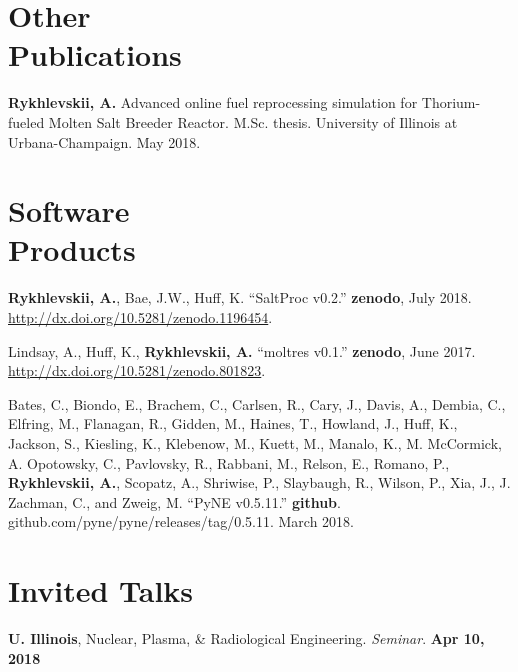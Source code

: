 \documentclass[margin,line]{resume}
\begin{document}
\begin{resume}
\section{\mysidestyle Other\\Publications}
\begin{bibenum}
	\item \textbf{Rykhlevskii, A.} Advanced  online fuel reprocessing 
	simulation for Thorium-fueled Molten Salt Breeder Reactor.
	M.Sc. thesis. University of Illinois at Urbana-Champaign.  May 2018.
\end{bibenum}
\section{\mysidestyle Software\\Products}
\begin{bibenum}
	\item \textbf{Rykhlevskii, A.}, Bae, J.W., Huff, K. ``SaltProc v0.2.'' 
	\textbf{zenodo}, July 2018.
	\url{http://dx.doi.org/10.5281/zenodo.1196454}.
	
	\item Lindsay, A., Huff, K., \textbf{Rykhlevskii, A.} ``moltres v0.1.'' 
	\textbf{zenodo}, June 2017. \url{http://dx.doi.org/10.5281/zenodo.801823}.
	
	\item Bates, C., Biondo, E., Brachem, C., Carlsen, R., Cary, J., Davis, 
	A., Dembia, C., Elfring, M., Flanagan, R., Gidden, M., Haines, T., 
	Howland, J., Huff, K., Jackson, S., Kiesling, K., Klebenow, M., Kuett, M., 
	Manalo, K., M. McCormick, A. Opotowsky, C., Pavlovsky, R., Rabbani, M., 
	Relson, E., Romano, P., \textbf{Rykhlevskii, A.}, Scopatz, A., Shriwise, 
	P., Slaybaugh, R., Wilson, P., Xia, J., J. Zachman, C., and Zweig, M. 
	``PyNE v0.5.11.'' \textbf{github}. 
	github.com/pyne/pyne/releases/tag/0.5.11. March 2018. 
\end{bibenum}
    \section{\mysidestyle Invited Talks}
      \textbf{U. Illinois}, Nuclear, Plasma, \& Radiological Engineering. \emph{Seminar}.  \hfill\textbf{Apr 10, 2018}\\

\end{resume}
\end{document}
